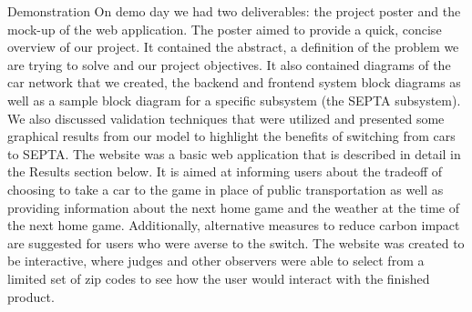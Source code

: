 Demonstration
On demo day we had two deliverables: the project poster and the mock-up of the web application.
The poster aimed to provide a quick, concise overview of our project. It contained the abstract, a definition of the problem we are trying to solve and our project objectives. It also contained diagrams of the car network that we created, the backend and frontend system block diagrams as well as a sample block diagram for a specific subsystem (the SEPTA subsystem). We also discussed validation techniques that were utilized and presented some graphical results from our model to highlight the benefits of switching from cars to SEPTA.
The website was a basic web application that is described in detail in the Results section below. It is aimed at informing users about the tradeoff of choosing to take a car to the game in place of public transportation as well as providing information about the next home game and the weather at the time of the next home game. Additionally, alternative measures to reduce carbon impact are suggested for users who were averse to the switch. The website was created to be interactive, where judges and other observers were able to select from a limited set of zip codes to see how the user would interact with the finished product.
